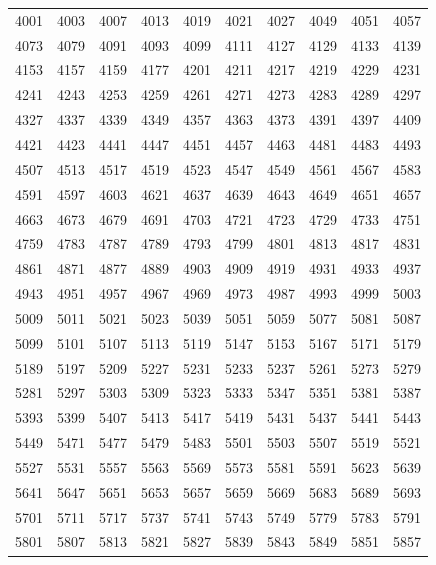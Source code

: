 \documentclass{article}
\begin{document}

\begin{tabular}{rrrrrrrrrr}
4001 & 4003 & 4007 & 4013 & 4019 & 4021 & 4027 & 4049 & 4051 & 4057 \\
4073 & 4079 & 4091 & 4093 & 4099 & 4111 & 4127 & 4129 & 4133 & 4139 \\
4153 & 4157 & 4159 & 4177 & 4201 & 4211 & 4217 & 4219 & 4229 & 4231 \\
4241 & 4243 & 4253 & 4259 & 4261 & 4271 & 4273 & 4283 & 4289 & 4297 \\
4327 & 4337 & 4339 & 4349 & 4357 & 4363 & 4373 & 4391 & 4397 & 4409 \\
4421 & 4423 & 4441 & 4447 & 4451 & 4457 & 4463 & 4481 & 4483 & 4493 \\
4507 & 4513 & 4517 & 4519 & 4523 & 4547 & 4549 & 4561 & 4567 & 4583 \\
4591 & 4597 & 4603 & 4621 & 4637 & 4639 & 4643 & 4649 & 4651 & 4657 \\
4663 & 4673 & 4679 & 4691 & 4703 & 4721 & 4723 & 4729 & 4733 & 4751 \\
4759 & 4783 & 4787 & 4789 & 4793 & 4799 & 4801 & 4813 & 4817 & 4831 \\
4861 & 4871 & 4877 & 4889 & 4903 & 4909 & 4919 & 4931 & 4933 & 4937 \\
4943 & 4951 & 4957 & 4967 & 4969 & 4973 & 4987 & 4993 & 4999 & 5003 \\
5009 & 5011 & 5021 & 5023 & 5039 & 5051 & 5059 & 5077 & 5081 & 5087 \\
5099 & 5101 & 5107 & 5113 & 5119 & 5147 & 5153 & 5167 & 5171 & 5179 \\
5189 & 5197 & 5209 & 5227 & 5231 & 5233 & 5237 & 5261 & 5273 & 5279 \\
5281 & 5297 & 5303 & 5309 & 5323 & 5333 & 5347 & 5351 & 5381 & 5387 \\
5393 & 5399 & 5407 & 5413 & 5417 & 5419 & 5431 & 5437 & 5441 & 5443 \\
5449 & 5471 & 5477 & 5479 & 5483 & 5501 & 5503 & 5507 & 5519 & 5521 \\
5527 & 5531 & 5557 & 5563 & 5569 & 5573 & 5581 & 5591 & 5623 & 5639 \\
5641 & 5647 & 5651 & 5653 & 5657 & 5659 & 5669 & 5683 & 5689 & 5693 \\
5701 & 5711 & 5717 & 5737 & 5741 & 5743 & 5749 & 5779 & 5783 & 5791 \\
5801 & 5807 & 5813 & 5821 & 5827 & 5839 & 5843 & 5849 & 5851 & 5857 \\
\end{tabular}
\end{document}
